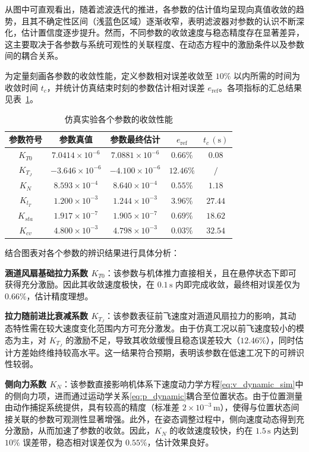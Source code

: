 从图中可直观看出，随着滤波迭代的推进，各参数的估计值均呈现向真值收敛的趋势，且其不确定性区间（浅蓝色区域）逐渐收窄，表明滤波器对参数的认识不断深化，估计置信度逐步提升。然而，不同参数的收敛速度与稳态精度存在显著差异，这主要取决于各参数与系统可观性的关联程度、在动态方程中的激励条件以及参数间的耦合关系。

为定量刻画各参数的收敛性能，定义参数相对误差收敛至 \(10\%\) 以内所需的时间为收敛时间 \(t_c\)，并统计仿真结束时刻的参数估计相对误差 \(e_{\text{ref}}\)。各项指标的汇总结果见表~\ref{tab:id_result}。
\begin{table}[htbp]
    \centering
    \caption{仿真实验各个参数的收敛性能}
    \label{tab:id_result}
    \begin{tabular}{ccccc}
    \toprule
    参数符号 & 参数真值 & 参数最终估计 & $e_{\text{ref}}$ & $t_c\,\mathrm{(s)}$ \\
    \midrule
    $K_{T0}$ & $7.0414 \times 10^{-6}$ & $7.0881 \times 10^{-6}$ & $0.66\%$ & $0.08$\\
    $K_{T_J}$ & $-3.646 \times 10^{-6}$ & $-4.100 \times 10^{-6}$ & $12.46\%$ & $/$ \\
    $K_{N}$ & $8.593 \times 10^{-4}$ & $8.640 \times 10^{-4}$ & $0.55\%$ & $1.18$ \\
    $K_{l_T}$ & $1.200 \times 10^{-3}$ & $1.244 \times 10^{-3}$ & $3.96\%$ & $27.44$ \\
    $K_{sta}$ & $1.917 \times 10^{-7}$ & $1.905 \times 10^{-7}$ & $0.69\%$ & $18.62$ \\
    $K_{cv}$ & $4.800 \times 10^{-3}$ & $4.798 \times 10^{-3}$ & $0.03\%$ & $32.54$ \\
    \bottomrule
    \end{tabular}
\end{table}

结合图表对各个参数的辨识结果进行具体分析：

\textbf{涵道风扇基础拉力系数 \(K_{T0}\)}：该参数与机体推力直接相关，且在悬停状态下即可获得充分激励。因此其收敛速度极快，在 \(0.1\,\mathrm{s}\) 内即完成收敛，最终相对误差仅为 \(0.66\%\)，估计精度理想。
    
\textbf{拉力随前进比衰减系数 \(K_{T_J}\)}：该参数表征前飞速度对涵道风扇拉力的影响，其动态特性需在较大速度变化范围内方可充分激发。由于仿真工况以前飞速度较小的模态为主，对 \(K_{T_J}\) 的激励不足，导致其收敛缓慢且稳态误差较大（\(12.46\%\)），同时估计方差始终维持较高水平。这一结果符合预期，表明该参数在低速工况下的可辨识性较弱。

\textbf{侧向力系数 \(K_{N}\)}：该参数直接影响机体系下速度动力学方程\eqref{eq:v_dynamic_sim}中的侧向力项，进而通过运动学关系\eqref{eq:p_dynamic}耦合至位置状态。由于位置测量由动作捕捉系统提供，具有较高的精度（标准差 \(2\times10^{-3}\,\mathrm{m}\)），使得与位置状态间接关联的参数可观测性显著增强。此外，在姿态调整过程中，侧向速度动态得到充分激励，从而加速了参数的收敛。因此，\(K_{N}\) 的收敛速度较快，约在 \(1.5\,\mathrm{s}\) 内达到 \(10\%\) 误差带，稳态相对误差仅为 \(0.55\%\)，估计效果良好。

